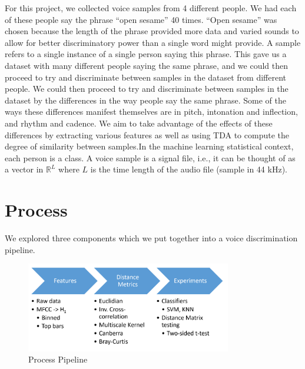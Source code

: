 \documentclass[12pt]{article}
\begin{document}
\-\hspace{1cm} For this project, we collected voice samples from 4 different
people. We had each of these people say the phrase ``open sesame'' 40 times.
``Open sesame'' was chosen because the length of the phrase provided more data
and varied sounds to allow for better discriminatory power than a single word
might provide. A sample refers to a single instance of a single person saying
this phrase. This gave us a dataset with many different people saying the same
phrase, and we could then proceed to try and discriminate between samples in
the dataset from different people. We could then proceed to try and discriminate
between samples in the dataset by the differences in the way people say the
same phrase. Some of the ways these differences manifest themselves are in
pitch, intonation and inflection, and rhythm and cadence. We aim to take
advantage of the effects of these differences by extracting various features as
well as using TDA to compute the degree of similarity between samples.In the
machine learning statistical context, each person is a class. A voice sample is
a signal file, i.e., it can be thought of as a vector in $\mathbb{R}^L$ where
$L$ is the time length of the audio file (sample in 44 kHz).

\section{Process}
\-\hspace{1cm} We explored three components which we put together into a voice
discrimination pipeline.
\begin{figure}[!ht]
\centering
\includegraphics[width=0.8\textwidth]{process.png}
\caption{Process Pipeline}
\end{figure}
\newline
\end{document}
